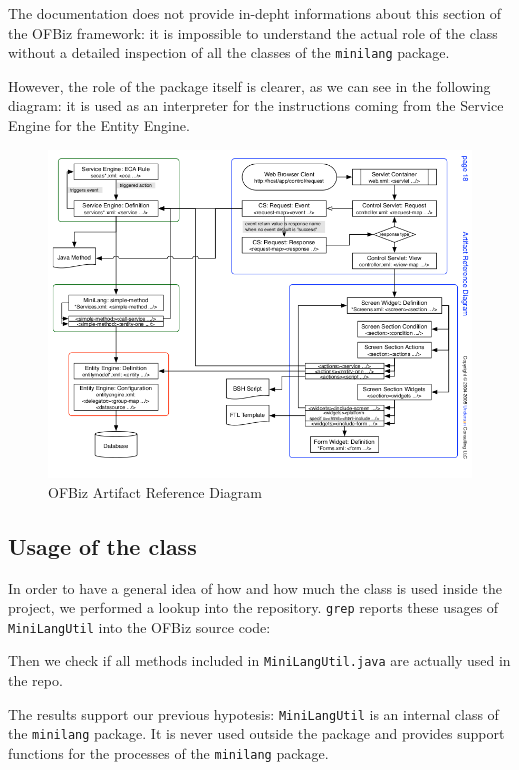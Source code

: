 \documentclass[11pt]{article} %
\begin{document}
The documentation does not provide in-depht informations about this section of the OFBiz framework: it is impossible to understand the actual role of the class without a detailed inspection of all the classes of the \texttt{minilang} package.

However, the role of the package itself is clearer, as we can see in the following diagram: it is used as an interpreter for the instructions coming from the Service Engine for the Entity Engine.

\begin{figure}[H]
	\centering
	\includegraphics[width=1
\textwidth]{Diagram1.png}
	\caption{OFBiz Artifact Reference Diagram}
\end{figure}


\subsection{Usage of the class}

In order to have a general idea of how and how much the class is used inside the project, we performed a lookup into the repository. \texttt{grep} reports these usages of \texttt{MiniLangUtil} into the OFBiz source code:



Then we check if all methods included in \texttt{MiniLangUtil.java} are actually used in the repo.



The results support our previous hypotesis: \texttt{MiniLangUtil} is an internal class of the \texttt{minilang} package. It is never used outside the package and provides support functions for the processes of the \texttt{minilang} package.
\end{document}
